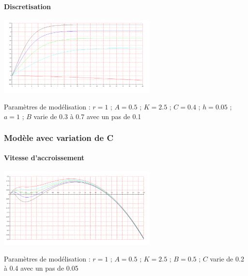 \documentclass{article}
\begin{document}
\paragraph{}


\paragraph{Discretisation}
\begin{center}
\includegraphics[width=300px]{img/part2/TrajB.png}
\end{center}
Paramètres de modélisation : $r=1$ ; $A=0.5$ ; $K=2.5$ ; $C=0.4$ ; $h=0.05$ ; $a=1$ ; $B$ varie de 0.3 à 0.7 avec un pas de 0.1
\paragraph{}

\subsubsection{Modèle avec variation de C}

\paragraph{Vitesse d'accroissement}
\begin{center}
\includegraphics[width=300px]{img/part2/logC.png}
\end{center}
Paramètres de modélisation :  $r=1$ ; $A=0.5$ ; $K=2.5$ ; $B=0.5$ ; $C$ varie de 0.2 à 0.4 avec un pas de 0.05
\paragraph{}
\end{document}
